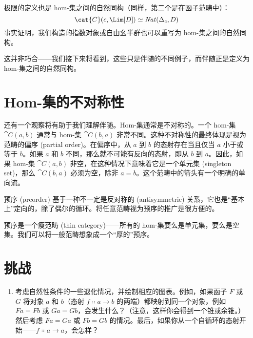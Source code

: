 极限的定义也是 hom-集之间的自然同构（同样，第二个是在函子范畴中）：
\[\cat{C}(c, \Lim[D]) \simeq \mathit{Nat}(\Delta_c, D)\]
事实证明，我们构造的指数对象或自由幺半群也可以重写为 hom-集之间的自然同构。

这并非巧合——我们接下来将看到，这些只是伴随的不同例子，而伴随正是定义为 hom-集之间的自然同构。

\section{Hom-集的不对称性}

还有一个观察将有助于我们理解伴随。Hom-集通常是不对称的。一个 hom-集 $\cat{C}(a, b)$ 通常与 hom-集 $\cat{C}(b, a)$ 非常不同。这种不对称性的最终体现是视为范畴的偏序 (partial order)。在偏序中，从 $a$ 到 $b$ 的态射存在当且仅当 $a$ 小于或等于 $b$。如果 $a$ 和 $b$ 不同，那么就不可能有反向的态射，即从 $b$ 到 $a$。因此，如果 hom-集 $\cat{C}(a, b)$ 非空，在这种情况下意味着它是一个单元集 (singleton set)，那么 $\cat{C}(b, a)$ 必须为空，除非 $a = b$。这个范畴中的箭头有一个明确的单向流。

预序 (preorder) 基于一种不一定是反对称的 (antisymmetric) 关系，它也是“基本上”定向的，除了偶尔的循环。将任意范畴视为预序的推广是很方便的。

预序是一个瘦范畴 (thin category)——所有的 hom-集要么是单元集，要么是空集。我们可以将一般范畴想象成一个“厚的”预序。

\section{挑战}

\begin{enumerate}
  \tightlist
  \item
        考虑自然性条件的一些退化情况，并绘制相应的图表。例如，如果函子 $F$ 或 $G$ 将对象 $a$ 和 $b$（态射 $f \Colon a \to b$ 的两端）都映射到同一个对象，例如 $F a = F b$ 或 $G a = G b$，会发生什么？（注意，这样你会得到一个锥或余锥。）然后考虑 $F a = G a$ 或 $F b = G b$ 的情况。最后，如果你从一个自循环的态射开始——$f \Colon a \to a$，会怎样？
\end{enumerate}